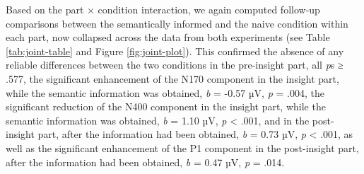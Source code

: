 \documentclass[
  english,
  doc,12pt,twoside,floatsintext]{apa7}
\begin{document}
Based on the part × condition interaction, we again computed follow-up comparisons between the semantically informed and the naive condition within each part, now collapsed across the data from both experiments (see Table \ref{tab:joint-table} and Figure \ref{fig:joint-plot}). This confirmed the absence of any reliable differences between the two conditions in the pre-insight part, all \emph{p}s ≥ .577, the significant enhancement of the N170 component in the insight part, while the semantic information was obtained, \emph{b} = -0.57 µV, \emph{p} = .004, the significant reduction of the N400 component in the insight part, while the semantic information was obtained, \emph{b} = 1.10 µV, \emph{p} \textless{} .001, and in the post-insight part, after the information had been obtained, \emph{b} = 0.73 µV, \emph{p} \textless{} .001, as well as the significant enhancement of the P1 component in the post-insight part, after the information had been obtained, \emph{b} = 0.47 µV, \emph{p} = .014.
\end{document}
